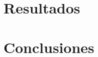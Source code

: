 \documentclass[stu,12pt,floatsintext]{apa7}
\begin{document}
\clearpage




\section{Resultados}


\clearpage

\section{Conclusiones}


\clearpage


\printbibliography
\end{document}
